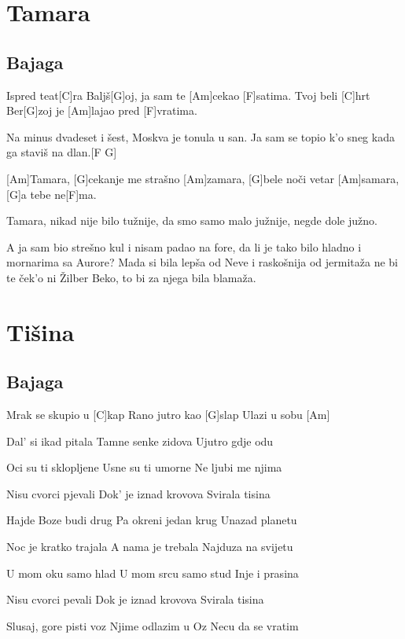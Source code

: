 \documentclass[a4paper,12pt]{article}
\begin{document}
\begin{multicols}{2}
\begin{guitar}
\end{guitar}
\section{Tamara}
\subsection*{Bajaga}
\begin{guitar}

Ispred teat[C]ra Baljš[G]oj,
ja sam te [Am]cekao [F]satima.
Tvoj beli [C]hrt Ber[G]zoj 
je [Am]lajao pred [F]vratima.


Na minus dvadeset i šest,
Moskva je tonula u san.
Ja sam se topio k'o sneg 
kada ga staviš na dlan.[F G]


[Am]Tamara,
[G]cekanje me strašno [Am]zamara,
[G]bele noči vetar [Am]samara,
[G]a tebe ne[F]ma.


Tamara,
nikad nije bilo tužnije,
da smo samo malo južnije,
negde dole južno.


A ja sam bio strešno kul 
i nisam padao na fore,
da li je tako bilo hladno 
i mornarima sa Aurore? 
Mada si bila lepša od Neve
i raskošnija od jermitaža 
ne bi te ček'o ni Žilber Beko,
to bi za njega bila blamaža.

\end{guitar}
\section{Tišina}
\subsection*{Bajaga}
\begin{guitar}
[Am]Mrak se skupio u [C]kap
Rano jutro kao [G]slap
Ulazi u sobu  [Am]


Dal' si ikad pitala
Tamne senke zidova
Ujutro gdje odu


Oci su ti sklopljene
Usne su ti umorne
Ne ljubi me njima


Nisu cvorci pjevali
Dok' je iznad krovova
Svirala tisina


Hajde Boze budi drug
Pa okreni jedan krug
Unazad planetu


Noc je kratko trajala
A nama je trebala
Najduza na svijetu


U mom oku samo hlad
U mom srcu samo stud
Inje i prasina


Nisu cvorci pevali
Dok je iznad krovova
Svirala tisina


Slusaj, gore pisti voz
Njime odlazim u Oz
Necu da se vratim



\end{guitar}
\end{multicols}
\end{document}
